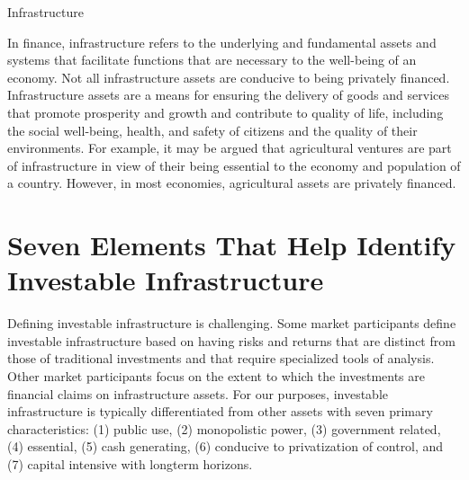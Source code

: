 \documentclass[11pt]{article}
\begin{document}
Infrastructure

In finance, infrastructure refers to the underlying and fundamental assets and systems that facilitate functions that are necessary to the well-being of an economy. Not all infrastructure assets are conducive to being privately financed. Infrastructure assets are a means for ensuring the delivery of goods and services that promote prosperity and growth and contribute to quality of life, including the social well-being, health, and safety of citizens and the quality of their environments. For example, it may be argued that agricultural ventures are part of infrastructure in view of their being essential to the economy and population of a country. However, in most economies, agricultural assets are privately financed.

\section*{Seven Elements That Help Identify Investable Infrastructure}
Defining investable infrastructure is challenging. Some market participants define investable infrastructure based on having risks and returns that are distinct from those of traditional investments and that require specialized tools of analysis. Other market participants focus on the extent to which the investments are financial claims on infrastructure assets. For our purposes, investable infrastructure is typically differentiated from other assets with seven primary characteristics: (1) public use, (2) monopolistic power, (3) government related, (4) essential, (5) cash generating, (6) conducive to privatization of control, and (7) capital intensive with longterm horizons.
\end{document}
